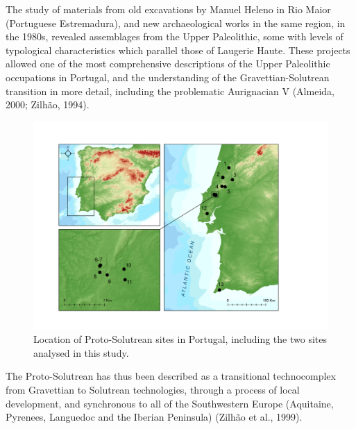 \documentclass[12pt,twoside]{reedthesis}
\begin{document}
The study of materials from old excavations by Manuel Heleno in Rio Maior (Portuguese Estremadura), and new archaeological works in the same region, in the 1980s, revealed assemblages from the Upper Paleolithic, some with levels of typological characteristics which parallel those of Laugerie Haute. These projects allowed one of the most comprehensive descriptions of the Upper Paleolithic occupations in Portugal, and the understanding of the Gravettian-Solutrean transition in more detail, including the problematic Aurignacian V (Almeida, 2000; Zilhão, 1994).
\begin{figure}

{\centering \includegraphics[width=1\linewidth]{figure/map_proto_solutrean} 

}

\caption{Location of Proto-Solutrean sites in Portugal, including the two sites analysed in this study.}\label{fig:protomap}
\end{figure}
The Proto-Solutrean has thus been described as a transitional technocomplex from Gravettian to Solutrean technologies, through a process of local development, and synchronous to all of the Southwestern Europe (Aquitaine, Pyrenees, Languedoc and the Iberian Peninsula) (Zilhão et al., 1999).
\end{document}
